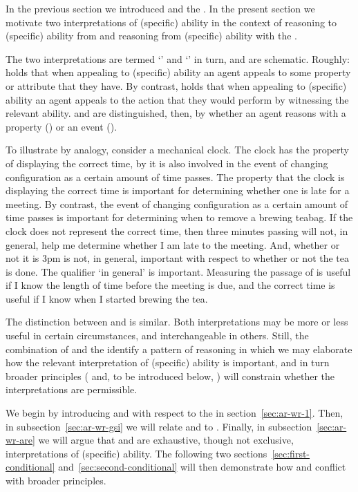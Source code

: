 \begin{note}
  In the previous section we introduced \gsi{-} and the \aben{}.
  In the present section we motivate two interpretations of (specific) ability in the context of reasoning to (specific) ability from \gsi{} and reasoning from (specific) ability with the \aben{}.

  The two interpretations are termed `\AR{}' and `\WR{}' in turn, and are schematic.
  Roughly:
  \AR{} holds that when appealing to (specific) ability an agent appeals to some property or attribute that they have.
  By contrast, \WR{} holds that when appealing to (specific) ability an agent appeals to the action that they would perform by witnessing the relevant ability.
  \AR{} and \WR{} are distinguished, then, by whether an agent reasons with a property (\AR{}) or an event (\WR{}).

  To illustrate by analogy, consider a mechanical clock.
  The clock has the property of displaying the correct time, by it is also involved in the event of changing configuration as a certain amount of time passes.
  The property that the clock is displaying the correct time is important for determining whether one is late for a meeting.
  By contrast, the event of changing configuration as a certain amount of time passes is important for determining when to remove a brewing teabag.
  If the clock does not represent the correct time, then three minutes passing will not, in general, help me determine whether I am late to the meeting.
  And, whether or not it is 3pm is not, in general, important with respect to whether or not the tea is done.
  The qualifier `in general' is important.
  Measuring the passage of is useful if I know the length of time before the meeting is due, and the correct time is useful if I know when I started brewing the tea.

  The distinction between \AR{} and \WR{} is similar.
  Both interpretations may be more or less useful in certain circumstances, and interchangeable in others.
  Still, the combination of \gsi{} and the \aben{} identify a pattern of reasoning in which we may elaborate how the relevant interpretation of (specific) ability is important, and in turn broader principles (\ESU{} and, to be introduced below, \nI{}) will constrain whether the interpretations are permissible.

  We begin by introducing \AR{} and \WR{} with respect to the \aben{} in section~\ref{sec:ar-wr-1}.
  Then, in subsection~\ref{sec:ar-wr-gsi} we will relate \AR{} and \WR{} to \gsi{}.
  Finally, in subsection~\ref{sec:ar-wr-are} we will argue that \AR{} and \WR{} are exhaustive, though not exclusive, interpretations of (specific) ability.
  The following two sections~\ref{sec:first-conditional} and~\ref{sec:second-conditional} will then demonstrate how \WR{} and \AR{} conflict with broader principles.
\end{note}

